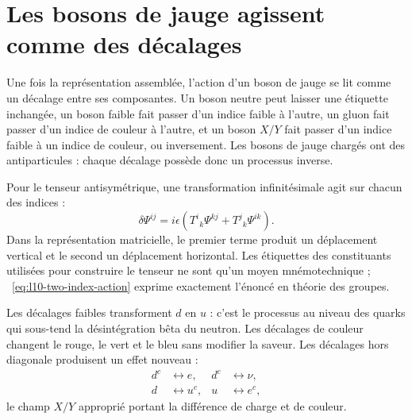 \section{Les bosons de jauge agissent comme des décalages}

Une fois la représentation assemblée, l’action d’un boson de jauge se lit comme un décalage entre ses composantes. Un boson neutre peut laisser une étiquette inchangée, un boson faible fait passer d’un indice faible à l’autre, un gluon fait passer d’un indice de couleur à l’autre, et un boson \(X/Y\) fait passer d’un indice faible à un indice de couleur, ou inversement. Les bosons de jauge chargés ont des antiparticules : chaque décalage possède donc un processus inverse.

Pour le tenseur antisymétrique, une transformation infinitésimale agit sur chacun des indices :
\begin{equation}
\delta\Psi^{ij}
=
i\epsilon
\left(
T^i{}_k\Psi^{kj}
+
T^j{}_k\Psi^{ik}
\right).
\label{eq:l10-two-index-action}
\end{equation}
Dans la représentation matricielle, le premier terme produit un déplacement vertical et le second un déplacement horizontal. Les étiquettes des constituants utilisées pour construire le tenseur ne sont qu’un moyen mnémotechnique ; ~\eqref{eq:l10-two-index-action} exprime exactement l’énoncé en théorie des groupes.

Les décalages faibles transforment \(d\) en \(u\) : c’est le processus au niveau des quarks qui sous-tend la désintégration bêta du neutron. Les décalages de couleur changent le rouge, le vert et le bleu sans modifier la saveur. Les décalages hors diagonale produisent un effet nouveau :
\begin{equation}
\begin{aligned}
d^c&\longleftrightarrow e,
& d^c&\longleftrightarrow\nu,\\
d&\longleftrightarrow u^c,
& u&\longleftrightarrow e^c,
\end{aligned}
\label{eq:l10-leptoquark-shifts}
\end{equation}
le champ \(X/Y\) approprié portant la différence de charge et de couleur.

\begin{classroomqa}
\end{classroomqa}

